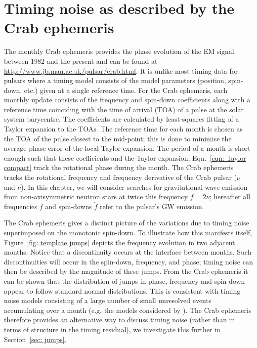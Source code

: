 \documentclass[../full_thesis/full_thesis.tex]{subfiles}
\begin{document}
\section{Timing noise as described by the Crab ephemeris}
\label{sec: timing noise as described by the crab ephemeris}
The monthly Crab ephemeris \citep{Lyne1993} provides the phase evolution of the
EM signal between 1982 and the present and can be found at
\url{http://www.jb.man.ac.uk/pulsar/crab.html}. It is unlike most timing data
for pulsars where a timing model consists of the model parameters (position,
spin-down, etc.) given at a single reference time.  For the Crab ephemeris,
each monthly update consists of the frequency and spin-down coefficients along
with a reference time coinciding with the time of arrival (TOA) of a pulse at
the solar system barycentre. The coefficients are calculated by  least-squares
fitting of a Taylor expansion to the TOAs. The reference time for each month is
chosen as the TOA of the pulse closest to the mid-point; this is done to
minimise the average phase error of the local Taylor expansion.  The period of
a month is short enough such that these coefficients and the Taylor
expansion, Eqn.~\eqref{eqn: Taylor compact} track the rotational phase during
the month. The Crab ephemeris tracks
the rotational frequency and frequency derivative of the Crab pulsar ($\nu$ and
$\dot{\nu}$). In this chapter, we will consider searches for gravitational
wave emission from
non-axisymmetric neutron stars at twice this frequency $f = 2\nu$; hereafter
all frequencies $f$ and spin-downs $\dot{f}$ refer to the pulsar's GW emission.

The Crab ephemeris gives a distinct picture of the variations due to timing
noise superimposed on the monotonic spin-down. To illustrate how this manifests
itself, Figure~\ref{fig: template jumps} depicts the frequency evolution in two
adjacent months. Notice that a discontinuity occurs at the interface between
months.  Such discontinuities will occur in the spin-down, frequency, and
phase; timing noise can then be described by the magnitude of these jumps.
From the Crab ephemeris it can be shown that the distribution of jumps in
phase, frequency and spin-down appear to follow standard normal distributions.
This is consistent with timing noise models consisting of a large number of
small unresolved events accumulating over a month (e.g. the models considered
by \citet{Cordes1981}). The Crab ephemeris therefore provides an alternative
way to discuss timing noise (rather than in terms of structure in the timing
residual), we investigate this further in Section~\ref{sec: jumps}.
\end{document}
